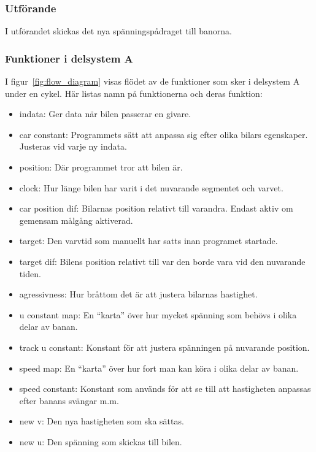     \subsubsection{Utförande}

    I utförandet skickas det nya spänningspådraget till banorna. 
	

    \subsubsection{Funktioner i delsystem A} \label{sec:system_a_funcs}
    I figur~\ref{fig:flow_diagram}  visas flödet av de funktioner som sker i delsystem A under en cykel.
    Här listas namn på funktionerna och deras funktion:
    \begin{itemize}
      \item indata: Ger data när bilen passerar en givare.
      \item car constant: Programmets sätt att anpassa sig efter olika bilars egenskaper. Justeras vid varje ny indata.
      \item position: Där programmet tror att bilen är.
      \item clock: Hur länge bilen har varit i det nuvarande segmentet och varvet.
      \item car position dif: Bilarnas position relativt till varandra. Endast aktiv om gemensam målgång aktiverad.
      \item target: Den varvtid som manuellt har satts inan programet startade.
      \item target dif: Bilens position relativt till var den borde vara vid den nuvarande tiden.
      \item agressivness: Hur bråttom det är att justera bilarnas hastighet.
      \item u constant map: En ``karta'' över hur mycket spänning som behövs i olika delar av banan.
      \item track u constant: Konstant för att justera spänningen på nuvarande position.
      \item speed map: En ``karta'' över hur fort man kan köra i olika delar av banan.
      \item speed constant: Konstant som används för att se till att hastigheten anpassas efter banans svängar m.m.
      \item new v: Den nya hastigheten som ska sättas.
      \item new u: Den spänning som skickas till bilen.
    \end{itemize}


